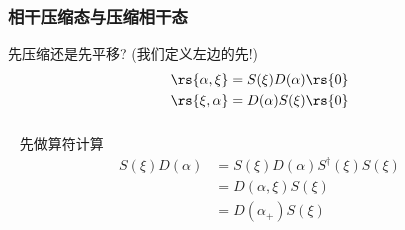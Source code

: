 
   \begin{frame}
    \frametitle{相干压缩态与压缩相干态}
         先压缩还是先平移? (我们定义左边的先!)
         \[\begin{aligned}
            \rs{\alpha,\xi } &=  S(\xi) D(\alpha) \rs{0} \\
            \rs{\xi, \alpha} &=  D(\alpha) S(\xi)\rs{0} \\
        \end{aligned} \]
        
    \end{frame}
    
    \begin{frame} 
    \frametitle{}  
    \例 [3.  求相干压缩态与压缩相干态的关系]{
        \[\rs{\alpha,\xi } = \rs{\xi, \alpha_{+}}, \qquad  \rs{\xi, \alpha } = \rs{\alpha_{-},\xi}\]
    }
     \解 ~ 先做算符计算
        \[\begin{aligned}
            S(\xi) D(\alpha) & = S(\xi) D(\alpha)S^\dagger (\xi) S(\xi) \\ 
            & = D(\alpha,\xi) S(\xi) \\ 
            &=  D(\alpha_{+}) S(\xi)  
        \end{aligned} \]
    \end{frame}



